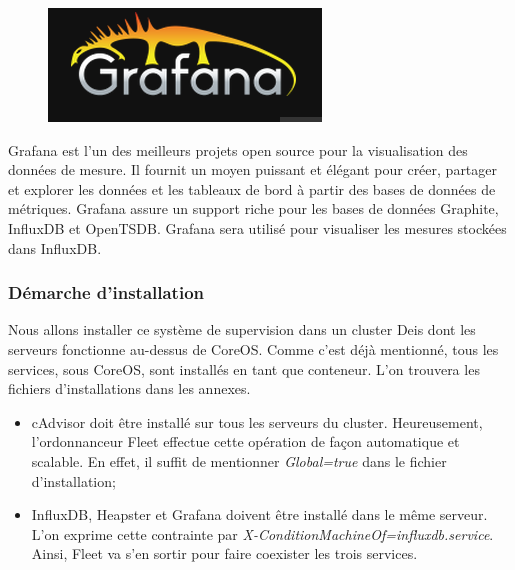 \begin{onehalfspace}

\begin{figure}
\centering
\includegraphics[scale=0.3]{chapitre4/assets/grafana}
\end{figure}
\noindent Grafana est l'un des meilleurs projets open source pour la visualisation des données de mesure. Il fournit un moyen puissant et élégant pour créer, partager et explorer les données et les tableaux de bord à partir des bases de données de métriques. Grafana assure un support riche pour les bases de données Graphite, InfluxDB et OpenTSDB. Grafana sera utilisé pour visualiser les mesures stockées dans InfluxDB.


\subsubsection{Démarche d'installation}

Nous allons installer ce système de supervision dans un cluster Deis dont les serveurs fonctionne au-dessus de CoreOS. Comme c'est déjà mentionné, tous les services, sous CoreOS, sont installés en tant que conteneur. L'on trouvera les fichiers d'installations dans les annexes.  

\begin{itemize}
	\item cAdvisor doit être installé sur tous les serveurs du cluster. Heureusement, l'ordonnanceur Fleet effectue cette opération de façon automatique et scalable. En effet, il suffit de mentionner \emph{Global=true} dans le fichier d'installation;
	\item InfluxDB, Heapster et Grafana doivent être installé dans le même serveur. L'on exprime cette contrainte par \emph{X-ConditionMachineOf=influxdb.service}. Ainsi, Fleet va s'en sortir pour faire coexister les trois services.
\end{itemize}


\end{onehalfspace}
